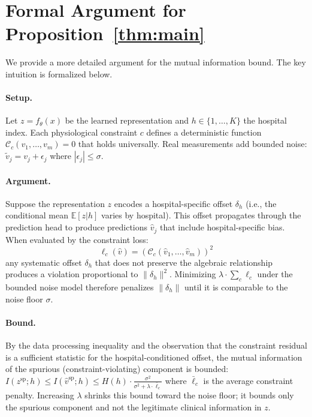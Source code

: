 \documentclass{article}
\begin{document}
\appendix

\section{Formal Argument for Proposition~\ref{thm:main}}
\label{app:proof}

We provide a more detailed argument for the mutual information bound. The key intuition is formalized below.

\paragraph{Setup.} Let $z = f_\theta(x)$ be the learned representation and $h \in \{1, \ldots, K\}$ the hospital index. Each physiological constraint $c$ defines a deterministic function $\mathcal{C}_c(v_1, \ldots, v_m) = 0$ that holds universally. Real measurements add bounded noise: $\tilde{v}_j = v_j + \epsilon_j$ where $|\epsilon_j| \leq \sigma$.

\paragraph{Argument.} Suppose the representation $z$ encodes a hospital-specific offset $\delta_h$ (i.e., the conditional mean $\mathbb{E}[z | h]$ varies by hospital). This offset propagates through the prediction head to produce predictions $\hat{v}_j$ that include hospital-specific bias. When evaluated by the constraint loss:
\begin{equation}
\ell_c(\hat{v}) = \left(\mathcal{C}_c(\hat{v}_1, \ldots, \hat{v}_m)\right)^2
\end{equation}
any systematic offset $\delta_h$ that does not preserve the algebraic relationship produces a violation proportional to $\|\delta_h\|^2$. Minimizing $\lambda \cdot \sum_c \ell_c$ under the bounded noise model therefore penalizes $\|\delta_h\|$ until it is comparable to the noise floor $\sigma$.

\paragraph{Bound.} By the data processing inequality and the observation that the constraint residual is a sufficient statistic for the hospital-conditioned offset, the mutual information of the spurious (constraint-violating) component is bounded:
$I(z^{\mathrm{sp}}; h) \leq I(\hat{v}^{\mathrm{sp}}; h) \leq H(h) \cdot \frac{\sigma^2}{\sigma^2 + \lambda \cdot \bar{\ell}_c}$
where $\bar{\ell}_c$ is the average constraint penalty. Increasing $\lambda$ shrinks this bound toward the noise floor; it bounds only the spurious component and not the legitimate clinical information in $z$.
\end{document}
